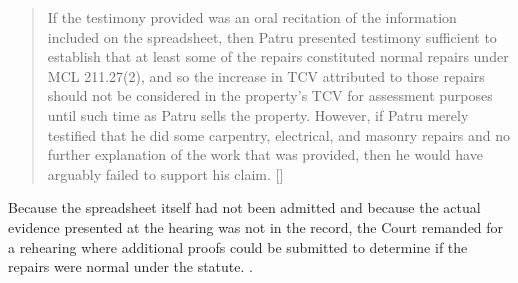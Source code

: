 \documentclass[12pt,\documentclassflag]{michiganCourtOfAppealsBrief}
\begin{document}
\begin{quote}If the testimony provided was an oral recitation of the
information included on the spreadsheet, then Patru presented testimony sufficient to establish
that at least some of the repairs constituted normal repairs under MCL 211.27(2), and so the
increase in TCV attributed to those repairs should not be considered in the property’s TCV for
assessment purposes until such time as Patru sells the property. However, if Patru merely
testified that he did some carpentry, electrical, and masonry repairs and no further explanation of
the work that was provided, then he would have arguably failed to support his claim. []
\end{quote}

Because the spreadsheet itself had not been admitted and because the actual evidence presented at the hearing was not in the record, the Court remanded for a rehearing where additional proofs could be submitted to determine if the repairs were normal under the statute. .







\end{document}
